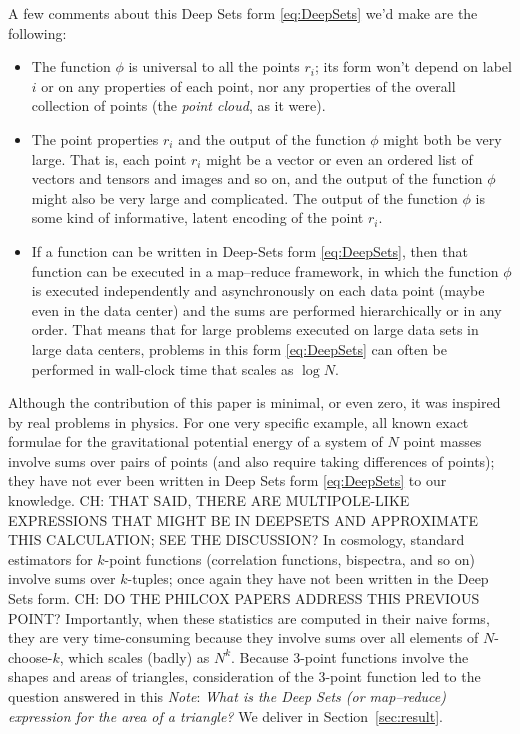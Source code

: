 \documentclass[12pt]{article}
\newcommand{\documentname}{\textsl{Note}}
\newcommand{\sectionname}{Section}
\newcommand{\secref}[1]{\sectionname~\ref{#1}}
\begin{document}
A few comments about this Deep Sets form \eqref{eq:DeepSets} we'd make are the following:
\begin{itemize}
    \item The function $\phi$ is universal to all the points $r_i$; its form won't depend on label $i$ or on any properties of each point, nor any properties of the overall collection of points (the \emph{point cloud}, as it were).
    \item The point properties $r_i$ and the output of the function $\phi$ might both be very large.
    That is, each point $r_i$ might be a vector or even an ordered list of vectors and tensors and images and so on, and the output of the function $\phi$ might also be very large and complicated.
    The output of the function $\phi$ is some kind of informative, latent encoding of the point $r_i$.
    \item If a function can be written in Deep-Sets form \eqref{eq:DeepSets}, then that function can be executed in a map--reduce framework, in which the function $\phi$ is executed independently and asynchronously on each data point (maybe even in the data center) and the sums are performed hierarchically or in any order.
    That means that for large problems executed on large data sets in large data centers, problems in this form \eqref{eq:DeepSets} can often be performed in wall-clock time that scales as $\log N$.
\end{itemize}

Although the contribution of this paper is minimal, or even zero, it was inspired by real problems in physics.
For one very specific example, all known exact formulae for the gravitational potential energy of a system of $N$ point masses involve sums over pairs of points (and also require taking differences of points); they have not ever been written in Deep Sets form \eqref{eq:DeepSets} to our knowledge.
CH: THAT SAID, THERE ARE MULTIPOLE-LIKE EXPRESSIONS THAT MIGHT BE IN DEEPSETS AND APPROXIMATE THIS CALCULATION; SEE THE DISCUSSION?
In cosmology, standard estimators for $k$-point functions (correlation functions, bispectra, and so on) involve sums over $k$-tuples; once again they have not been written in the Deep Sets form.
CH: DO THE PHILCOX PAPERS ADDRESS THIS PREVIOUS POINT?
Importantly, when these statistics are computed in their naive forms, they are very time-consuming because they involve sums over all elements of $N$-choose-$k$, which scales (badly) as $N^k$.
Because 3-point functions involve the shapes and areas of triangles, consideration of the 3-point function led to the question answered in this \documentname:
\emph{What is the Deep Sets (or map--reduce) expression for the area of a triangle?}
We deliver in \secref{sec:result}.
\end{document}
